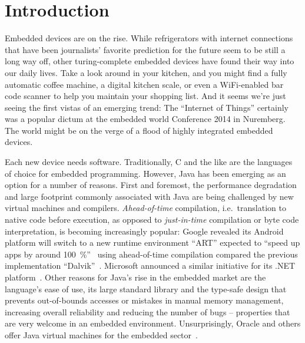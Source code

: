 
\chapter{Introduction}
	\label{chapter:intro}
	Embedded devices are on the rise. While refrigerators with internet connections that have been journalists' favorite
	prediction for the future seem to be still a long way off, other turing-complete embedded devices have found their way
	into our daily lives. Take a look around in your kitchen, and you might find a fully automatic coffee machine,
	a digital kitchen scale, or even a WiFi-enabled bar code scanner to help you maintain your shopping list. And it seems
	we're just seeing the first vistas of an emerging trend: The \enquote{Internet of Things} certainly was a popular
	dictum at the embedded world Conference 2014 in Nuremberg. The world might be on the verge of a flood of highly
	integrated embedded devices.


	Each new device needs software. Traditionally, C and the like are the languages of choice for embedded programming.
	However, Java has been emerging as an option for a number of reasons. First and foremost, the performance degradation
	and large footprint commonly associated with Java are being challenged by new virtual machines and compilers.
	\emph{Ahead-of-time} compilation, i.e.\ translation to native code before execution, as opposed to \emph{just-in-time}
	compilation or byte code interpretation, is becoming increasingly popular: Google revealed its Android platform will
	switch to a new runtime environment \enquote{ART} expected to \enquote{speed up apps by around
	100~\%}~\cite{anthony:13:android-art} using ahead-of-time compilation compared the previous implementation
	\enquote{Dalvik}~\cite{lindner:14:android-art}. Microsoft announced a similar initiative for its .NET
	platform~\cite{lardinois:14:dotnet-aot}. Other reasons for Java's rise in the embedded market are the language's ease
	of use, its large standard library and the type-safe design that prevents out-of-bounds accesses or mistakes in manual
	memory management, increasing overall reliability and reducing the number of bugs – properties that are very welcome
	in an embedded environment. Unsurprisingly, Oracle and others offer Java virtual machines for the embedded
	sector~\cite{merritt:13:java-for-IoT, maxfield:12:IS2T-JVM}.


